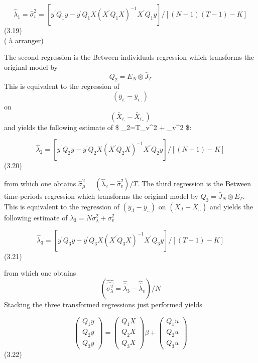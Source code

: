 \documentclass[
]{book}
\begin{document}
\begin{equation}
\widehat{\lambda}_{1}=\widehat{\sigma}_{v}^{2}=\left[y^{\prime} Q_{1} y-y^{\prime} Q_{1} X\left(X^{\prime} Q_{1} X\right)^{-1} X^{\prime} Q_{1} y\right] /[(N-1)(T-1)-K]
\end{equation} (3.19)\\
( à arranger)

The second regression is the Between individuals regression which transforms the original
model by \[Q_2=E_N \otimes \bar{J}_T \] This is equivalent to the regression of \[ (\bar{y}_{i.}- \bar{y}_{i..}) \] on
\[ (\bar{X}_{i.}- \bar{X}_{i..}) \]
and yields the following estimate of
\$ \lambda\_2=T\sigma\_v\^{}2 + \sigma\_v\^{}2 \$:

\begin{equation}
\widehat{\lambda}_{2}=\left[y^{\prime} Q_{2} y-y^{\prime} Q_{2} X\left(X^{\prime} Q_{2} X\right)^{-1} X^{\prime} Q_{2} y\right] /[(N-1)-K]
\end{equation} (3.20)

from which one obtains \(\widehat{\sigma}_{\mu}^{2}=\left(\widehat{\lambda}_{2}-\widehat{\sigma}_{v}^{2}\right) / T .\) The third regression is the Between time-periods regression which transforms the original model by \(Q_{3}=\bar{J}_{N} \otimes E_{T}\). This is equivalent to the regression of \(\left(\bar{y}_{. t}-\bar{y}_{. .}\right)\) on \(\left(\bar{X}_{. t}-\bar{X}_{. .}\right)\) and yields the following estimate of \(\lambda_{3}=N \sigma_{\lambda}^{2}+\sigma_{v}^{2}\)

\begin{equation}
\widehat{\lambda}_{3}=\left[y^{\prime} Q_{3} y-y^{\prime} Q_{3} X\left(X^{\prime} Q_{3} X\right)^{-1} X^{\prime} Q_{3} y\right] /[(T-1)-K]
\end{equation} (3.21)

from which one obtains
\[ (\widehat{\widehat {\sigma_\lambda^2} }= \widehat{\widehat {\lambda} }_3 -  \widehat{\widehat {\lambda} }_v)/N \] Stacking the three transformed regressions just
performed yields

\begin{equation}
\left(\begin{array}{l}
Q_{1} y \\
Q_{2} y \\
Q_{3} y
\end{array}\right)=\left(\begin{array}{l}
Q_{1} X \\
Q_{2} X \\
Q_{3} X
\end{array}\right) \beta+\left(\begin{array}{l}
Q_{1} u \\
Q_{2} u \\
Q_{3} u
\end{array}\right)
\end{equation} (3.22)
\end{document}
